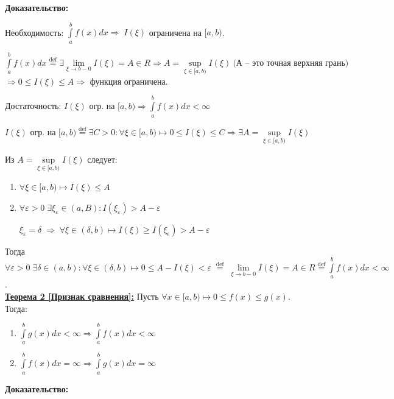 \documentclass[a4paper,12pt]{article} %
\newcommand{\eqdef}{\stackrel{\mathrm{def}}{=}}
\begin{document}
\textbf{Доказательство:} 

Необходимость: $\int\limits_a^{b} f(x) dx \Rightarrow\; I(\xi)$ ограничена на $[a, b)$.

$\int\limits_a^{b} f(x) dx \stackrel{\text{def}}{=} \exists \lim\limits_{\xi \rightarrow b-0}I(\xi) = A \in R \Rightarrow A = \sup\limits_{\xi \in[a,b)} I(\xi) ~ \text{(А -- это точная верхняя грань)} $ $\Rightarrow 0 \leq I(\xi) \leq A \Rightarrow$ функция ограничена.

Достаточность: $I(\xi)$  огр. на $[a, b) \Rightarrow \int\limits_a^{b} f(x) dx < \infty$

$I(\xi)$ огр. на $[a, b) \stackrel{\text{def}}{=} \exists C>0 : \forall \xi \in[a, b) \longmapsto 0 \leq I(\xi) \leq C \Rightarrow \exists A = \sup\limits_{\xi \in [a,b)}I(\xi)$

Из $A = \sup\limits_{\xi \in[a,b)} I(\xi)$ следует:

\begin{enumerate}
    \item $\forall \xi \in [a, b) \mapsto I(\xi) \leq A$
    
    \item $\forall \varepsilon > 0\; \exists \xi_\varepsilon \in (a, B) : I(\xi_\varepsilon)>A-\varepsilon$
    
    $\xi_\varepsilon = \delta \; \Rightarrow \; \forall \xi \in(\delta, b) \longmapsto I(\xi) \geq I(\xi_\epsilon)> A-\varepsilon$
\end{enumerate}

Тогда $\forall \varepsilon > 0 \; \exists\delta\in(a, b): \forall \xi \in(\delta, b) \longmapsto 0\leq A-I(\xi) < \varepsilon \; \stackrel{\text{def}}{=}\; \lim\limits_{\xi \rightarrow b-0} I(\xi) = A \in R \eqdef \int\limits_a^{b} f(x) dx < \infty$.\\

\underline{\textbf{Теорема 2 [Признак сравнения]:}} Пусть $\forall x \in [a, b) \longmapsto 0\leq f(x) \leq g(x)$. Тогда:

\begin{enumerate}
    \item $\int\limits_a^{b} g(x) dx < \infty \Rightarrow \int\limits_a^{b} f(x) dx < \infty$
    
    \item $\int\limits_a^{b} f(x) dx = \infty \Rightarrow \int\limits_a^{b} g(x) dx = \infty$
\end{enumerate}

\textbf{Доказательство:}
\end{document}
